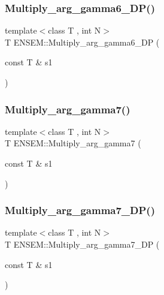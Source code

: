 \mbox{\label{namespaceENSEM_ae1c5c19c0bc38e6a6ab6ef8c654af325}} 
\subsubsection{\texorpdfstring{Multiply\_arg\_gamma6\_DP()}{Multiply\_arg\_gamma6\_DP()}}
{\footnotesize\ttfamily template$<$class T , int N$>$ \\
T E\+N\+S\+E\+M\+::\+Multiply\+\_\+arg\+\_\+gamma6\+\_\+\+DP (\begin{DoxyParamCaption}\item[{const T \&}]{s1 }\end{DoxyParamCaption})\hspace{0.3cm}{\ttfamily [inline]}}

\mbox{\label{namespaceENSEM_af6533488ba5049e3bff7f310721cbb7c}} 
\subsubsection{\texorpdfstring{Multiply\_arg\_gamma7()}{Multiply\_arg\_gamma7()}}
{\footnotesize\ttfamily template$<$class T , int N$>$ \\
T E\+N\+S\+E\+M\+::\+Multiply\+\_\+arg\+\_\+gamma7 (\begin{DoxyParamCaption}\item[{const T \&}]{s1 }\end{DoxyParamCaption})\hspace{0.3cm}{\ttfamily [inline]}}

\mbox{\label{namespaceENSEM_af8d5b6d451f6dbfcb8267d716e45f849}} 
\subsubsection{\texorpdfstring{Multiply\_arg\_gamma7\_DP()}{Multiply\_arg\_gamma7\_DP()}}
{\footnotesize\ttfamily template$<$class T , int N$>$ \\
T E\+N\+S\+E\+M\+::\+Multiply\+\_\+arg\+\_\+gamma7\+\_\+\+DP (\begin{DoxyParamCaption}\item[{const T \&}]{s1 }\end{DoxyParamCaption})\hspace{0.3cm}{\ttfamily [inline]}}

